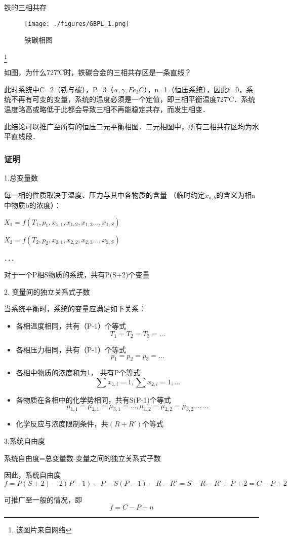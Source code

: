 \begin{example}{铁的三相共存}
\begin{figure}[ht]
\centering
\texttt{[image: ./figures/GBPL\_1.png]}
\caption{铁碳相图} \label{GBPL_fig1}
\end{figure}
\footnote{该图片来自网络}

如图，为什么727℃时，铁碳合金的三相共存区是一条直线？

此时系统中C=2（铁与碳），P=3（$\alpha, \gamma, Fe_3C$），n=1（恒压系统），因此f=0，系统不再有可变的变量，系统的温度必须是一个定值，即三相平衡温度727℃．系统温度略高或略低于此都会导致三相不再能稳定共存，而发生相变．

此结论可以推广至所有的恒压二元平衡相图．二元相图中，所有三相共存区均为水平直线段．
\end{example}

\subsubsection{证明}
1.总变量数

每一相的性质取决于温度、压力与其中各物质的含量 （临时约定$x_{a,b}$的含义为相a中物质b的浓度）：

$X_1=f(T_1, p_1,x_{1,1},x_{1,2},x_{1,3}...,x_{1,S})$

$X_2=f(T_2,p_2,x_{2,1},x_{2,2},x_{2,3}...,x_{2,S})$

．．．

对于一个P相S物质的系统，共有P(S+2)个变量

2. 变量间的独立关系式子数

当系统平衡时，系统的变量应满足如下关系：

\begin{itemize}
\item 各相温度相同，共有（P-1）个等式
\begin{equation}
T_1=T_2=T_3=...
\end{equation}
\item 各相压力相同，共有（P-1）个等式
\begin{equation}
p_1=p_2=p_3=...
\end{equation}
\item 各相中物质的浓度和为1， 共有P个等式
\begin{equation}
\sum x_{1,i} = 1, \sum x_{2,i} = 1, ...
\end{equation}
\item 各物质在各相中的化学势相同，共有S(P-1)个等式
\begin{equation}
\mu_{1,1}=\mu_{2,1}=\mu_{3,1}=..., \mu_{1,2}=\mu_{2,2}=\mu_{3,2}..., ...
\end{equation}
\item 化学反应与浓度限制条件，共$(R+R')$个等式
\end{itemize}

3.系统自由度

系统自由度=总变量数-变量之间的独立关系式子数

因此，系统自由度 
\begin{equation}
f = P(S+2) - 2(P-1) - P - S(P-1)-R-R'=S-R-R'+P+2=C-P+2
\end{equation}

可推广至一般的情况，即
\begin{equation}
f = C-P+n
\end{equation}
